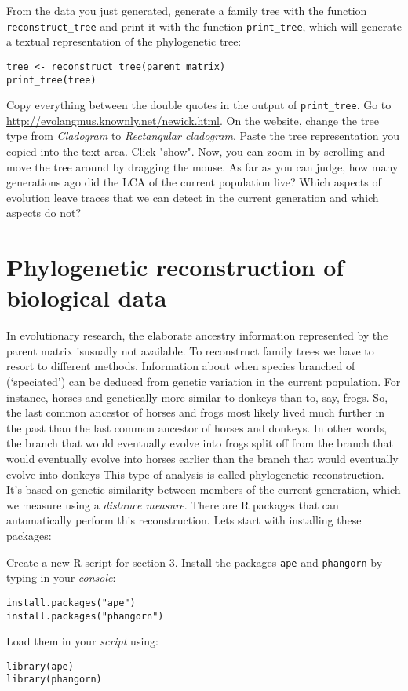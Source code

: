 \documentclass[a4paper, 9pt]{article}
\begin{document}
\begin{exercise}
\action From the data you just generated, generate a family tree with the function \verb|reconstruct_tree| and print it with the function \verb|print_tree|, which will generate a textual representation of the phylogenetic tree:
\begin{lstlisting}
tree <- reconstruct_tree(parent_matrix)
print_tree(tree)
\end{lstlisting}
\action Copy everything between the double quotes in the output of \texttt{print\_tree}. 
\action Go to \url{http://evolangmus.knownly.net/newick.html}. 
\action On the website, change the tree type from \textit{Cladogram} to \textit{Rectangular cladogram}.
\action Paste the tree representation you copied into the text area. 
\action Click "show". Now, you can zoom in by scrolling and move the tree around by dragging the mouse.
\askstar As far as you can judge, how many generations ago did the LCA of the current population live?
\askstar Which aspects of evolution leave traces that we can detect in the current generation and which aspects do not?
\end{exercise}

\section{Phylogenetic reconstruction of biological data}\label{phylogenetic-reconstruction-with-r}

In evolutionary research, the elaborate ancestry information represented
by the parent matrix isusually not available. To reconstruct family
trees we have to resort to different methods. Information about when
species branched of (`speciated') can be deduced from genetic variation
in the current population. For instance, horses and genetically more
similar to donkeys than to, say, frogs. So, the last common ancestor of
horses and frogs most likely lived much further in the past than the
last common ancestor of horses and donkeys. In other words, the branch
that would eventually evolve into frogs split off from the branch that
would eventually evolve into horses earlier than the branch that would
eventually evolve into donkeys This type of analysis is called
phylogenetic reconstruction. It's based on genetic similarity between
members of the current generation, which we measure using a
\emph{distance measure}. There are R packages that can automatically
perform this reconstruction. Lets start with installing these packages:

\begin{exercise}
\action Create a new R script for section 3.
    \action Install the packages \texttt{ape} and \texttt{phangorn} by typing in your \emph{console}:\begin{lstlisting}
install.packages("ape")
install.packages("phangorn")      
\end{lstlisting}
Load them in your \emph{script} using:\begin{lstlisting}
library(ape)
library(phangorn)
\end{lstlisting}
\end{exercise}
\end{document}
